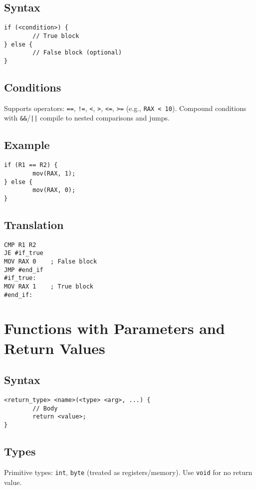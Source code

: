 \documentclass[a4paper,11pt]{book}
\begin{document}
\subsection*{Syntax}
\begin{lstlisting}[language=Wake]
if (<condition>) {
		// True block
} else {
		// False block (optional)
}
\end{lstlisting}

\subsection*{Conditions}
Supports operators: \texttt{==}, \texttt{!=}, \texttt{<}, \texttt{>}, \texttt{<=}, \texttt{>=} (e.g., \texttt{RAX < 10}). Compound conditions with \texttt{\&\&}/\texttt{||} compile to nested comparisons and jumps.

\subsection*{Example}
\begin{lstlisting}[language=Wake]
if (R1 == R2) {
		mov(RAX, 1);
} else {
		mov(RAX, 0);
}
\end{lstlisting}

\subsection*{Translation}
\begin{lstlisting}[language=MicroASM]
CMP R1 R2
JE #if_true
MOV RAX 0    ; False block
JMP #end_if
#if_true:
MOV RAX 1    ; True block
#end_if:
\end{lstlisting}

\section{Functions with Parameters and Return Values}
\subsection*{Syntax}
\begin{lstlisting}[language=Wake]
<return_type> <name>(<type> <arg>, ...) {
		// Body
		return <value>;
}
\end{lstlisting}

\subsection*{Types}
Primitive types: \texttt{int}, \texttt{byte} (treated as registers/memory). Use \texttt{void} for no return value.
\end{document}
